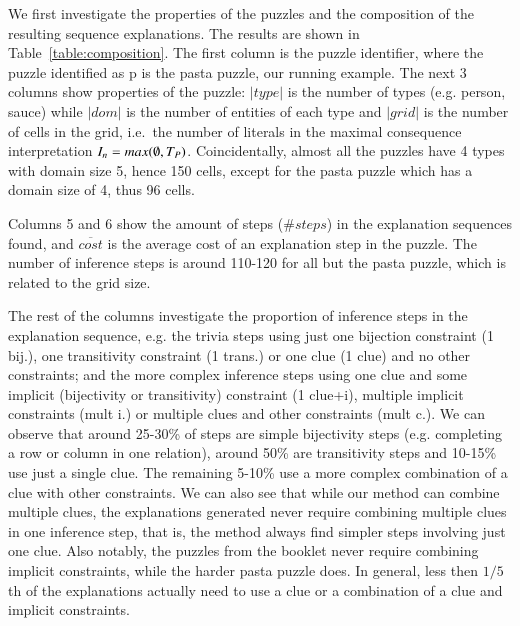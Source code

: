 We first investigate the properties of the puzzles and the composition of the resulting sequence explanations. The results are shown in Table~\ref{table:composition}. The first column is the puzzle identifier, where the puzzle identified as p is the pasta puzzle, our running example. 
The next 3 columns show properties of the puzzle:
$|type|$ is the number of types (e.g. person, sauce) while $|dom|$ is the number of entities of each type and $|grid|$ is the number of cells in the grid, i.e.\ the number of literals in the maximal consequence interpretation $I_n=max(\emptyset, T_P)$.
Coincidentally, almost all the puzzles have 4 types with domain size 5,  hence 150 cells, except for the pasta puzzle which has a domain size of 4, thus 96 cells.

Columns 5 and 6 show the amount of steps ($\# steps$) in the explanation sequences found, and $\overline{cost}$ is the average cost of an explanation step in the puzzle. The number of inference steps is around 110-120 for all but the pasta puzzle, which is related to the grid size.

The rest of the columns investigate the proportion of inference steps in the explanation sequence, e.g. the trivia steps using just one bijection constraint (1 bij.), one transitivity constraint (1 trans.) or one clue (1 clue) and no other constraints; and the more complex inference steps using one clue and some implicit (bijectivity or transitivity) constraint (1 clue+i), multiple implicit constraints (mult i.) or multiple clues and other constraints (mult c.). We can observe that around 25-30\% of steps are simple bijectivity steps (e.g. completing a row or column in one relation), around 50\% are transitivity steps and 10-15\% use just a single clue. The remaining 5-10\% use a more complex combination of a clue with other constraints. We can also see that while our method can combine multiple clues, the explanations generated never require combining multiple clues in one inference step, that is, the method always find simpler steps involving just one clue. Also notably, the puzzles from the booklet never require combining implicit constraints, while the harder pasta puzzle does. In general, less then $1/5$th of the explanations actually need to use a clue or a combination of a clue and implicit constraints.



